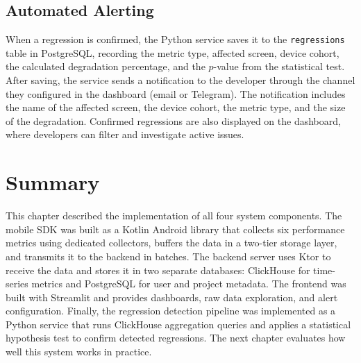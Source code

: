 \subsection{Automated Alerting}

When a regression is confirmed, the Python service saves it to the \texttt{regressions} table in PostgreSQL, recording the metric type, affected screen, device cohort, the calculated degradation percentage, and the $p$-value from the statistical test. After saving, the service sends a notification to the developer through the channel they configured in the dashboard (email or Telegram). The notification includes the name of the affected screen, the device cohort, the metric type, and the size of the degradation. Confirmed regressions are also displayed on the dashboard, where developers can filter and investigate active issues.

\section{Summary}

This chapter described the implementation of all four system components. The mobile SDK was built as a Kotlin Android library that collects six performance metrics using dedicated collectors, buffers the data in a two-tier storage layer, and transmits it to the backend in batches. The backend server uses Ktor to receive the data and stores it in two separate databases: ClickHouse for time-series metrics and PostgreSQL for user and project metadata. The frontend was built with Streamlit and provides dashboards, raw data exploration, and alert configuration. Finally, the regression detection pipeline was implemented as a Python service that runs ClickHouse aggregation queries and applies a statistical hypothesis test to confirm detected regressions. The next chapter evaluates how well this system works in practice.
